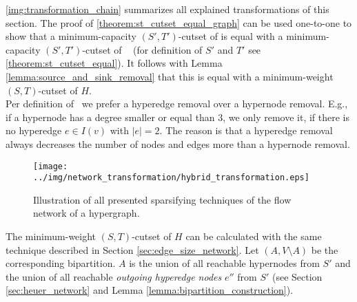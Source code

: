 \autoref{img:transformation_chain} summarizes all explained transformations of this section.
The proof of \autoref{theorem:st_cutset_equal_graph} can be used one-to-one to show that a minimum-capacity
$(S',T')$-cutset of  is equal with a minimum-capacity $(S',T')$-cutset of \ShortHybrid~
(for definition of $S'$ and $T'$ see \autoref{theorem:st_cutset_equal}). It follows with Lemma \ref{lemma:source_and_sink_removal}
that this is equal with a minimum-weight $(S,T)$-cutset of $H$. \\
Per definition of \ShortHybrid~we prefer a hyperedge removal over a hypernode removal. E.g., if
a hypernode has a degree smaller or equal than $3$, we only remove it, if there is no hyperedge
$e \in I(v)$ with $|e| = 2$. The reason is that a hyperedge removal always decreases the number of nodes
and edges more than a hypernode removal. \\
\begin{figure}[ht!]
\centering
\texttt{[image: ../img/network\_transformation/hybrid\_transformation.eps]}
\caption{Illustration of all presented sparsifying techniques of the flow network of a hypergraph.}
\label{img:transformation_chain}
\end{figure}
The minimum-weight $(S,T)$-cutset of $H$ can be calculated with the same technique described in Section
\ref{sec:edge_size_network}. Let $(A,V\setminus A)$ be the corresponding bipartition.
$A$ is the union of all reachable hypernodes from $S'$ and the union of
all reachable \emph{outgoing hyperedge nodes} $e''$ from $S'$ (see Section \ref{sec:heuer_network} 
and Lemma \ref{lemma:bipartition_construction}). 
